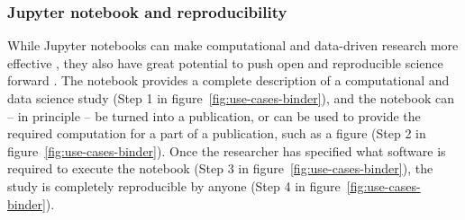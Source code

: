 % 
% 


\subsubsection{Jupyter notebook and reproducibility}

While Jupyter notebooks can make computational and data-driven research more effective
\cite{Perkel2018,Fangohr2020,Granger2021}, they also have great potential to push
open and reproducible science forward \cite{Beg2021}. The notebook provides a complete
description of a computational and data science study (Step 1 in
figure~\ref{fig:use-cases-binder}), and the notebook can -- in principle -- be
turned into a publication, or can be used to provide the required computation
for a part of a publication, such as a figure (Step 2 in
figure~\ref{fig:use-cases-binder}). Once the researcher has specified what
software is required to execute the notebook (Step 3 in
figure~\ref{fig:use-cases-binder}), the study is completely reproducible by
anyone (Step 4 in figure~\ref{fig:use-cases-binder}).

